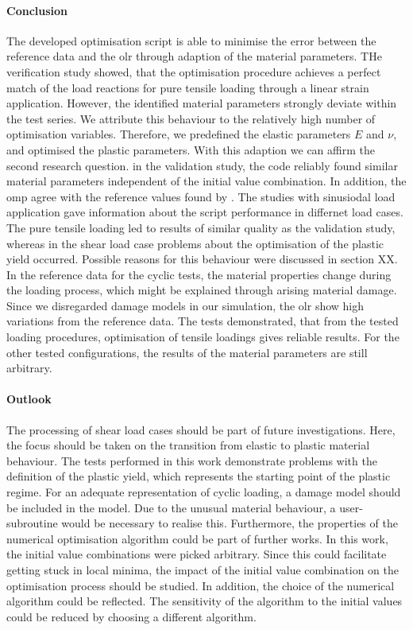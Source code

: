 \paragraph{Conclusion}
The developed optimisation script is able to minimise the error between the reference data and the \acrlong{olr} through adaption of the material parameters. THe verification study showed, that the optimisation procedure achieves a perfect match of the load reactions for pure tensile loading through a linear strain application. However, the identified material parameters strongly deviate within the test series. We attribute this behaviour to the relatively high number of optimisation variables. Therefore, we predefined the elastic parameters $E$ and $\nu$, and optimised the plastic parameters. With this adaption we can affirm the second research question. in the validation study, the code reliably found similar material parameters independent of the initial value combination. In addition, the \acrlong{omp} agree with the reference values found by \citet{ries_deciphering_nodate}. The studies with sinusiodal load application gave information about the script performance in differnet load cases. The pure tensile loading led to results of similar quality as the validation study, whereas in the shear load case problems about the optimisation of the plastic yield occurred. Possible reasons for this behaviour were discussed in section XX. In the reference data for the cyclic tests, the material properties change during the loading process, which might be explained through arising material damage. Since we disregarded damage models in our  simulation, the \acrlong{olr} show high variations from the reference data. The tests demonstrated, that from the tested loading procedures, optimisation of tensile loadings gives reliable results. For the other tested configurations, the results of the material parameters are still arbitrary.


\paragraph{Outlook}
The processing of shear load cases should be part of future investigations. Here, the focus should be taken on the transition from elastic to plastic material behaviour. The tests performed in this work demonstrate problems with the definition of the plastic yield, which represents the starting point of the plastic regime. 
For an adequate representation of cyclic loading, a damage model should be included in the  model. Due to the unusual material behaviour, a user-subroutine would be necessary to realise this. 
Furthermore, the properties of the numerical optimisation algorithm could be part of further works. In this work, the initial value combinations were picked arbitrary. Since this could facilitate getting stuck in local minima, the impact of the initial value combination on the optimisation process should be studied. In addition, the choice of the numerical algorithm could be reflected. The sensitivity of the algorithm to the initial values could be reduced by choosing a different algorithm. 

